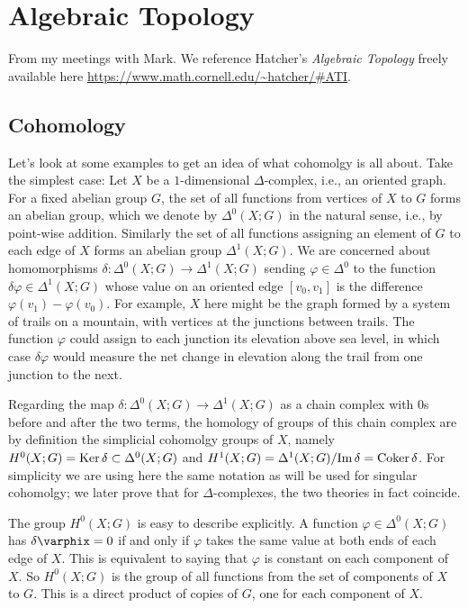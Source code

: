 \chapter{Algebraic Topology}
From my meetings with Mark. We reference Hatcher's \emph{Algebraic
  Topology} \cite{hatcher} freely available here
\url{https://www.math.cornell.edu/~hatcher/#ATI}.

\section{Cohomology}
Let's look at some examples to get an idea of what cohomolgy is all
about. Take the simplest case: Let \(X\) be a \(1\)-dimensional
\(\Delta\)-complex, i.e., an oriented graph. For a fixed abelian group
\(G\), the set of all functions from vertices of \(X\) to \(G\) forms an
abelian group, which we denote by \(\Delta^0(X;G)\) in the natural sense,
i.e., by point-wise addition. Similarly the set of all functions assigning
an element of \(G\) to each edge of \(X\) forms an abelian group
\(\Delta^1(X;G)\). We are concerned about homomorphisms
\(\delta\colon\Delta^0(X;G)\to\Delta^1(X;G)\) sending
\(\varphi\in\Delta^0\) to the function \(\delta\varphi\in\Delta^1(X;G)\)
whose value on an oriented edge \([v_0,v_1]\) is the difference
\(\varphi(v_1)-\varphi(v_0)\). For example, \(X\) here might be the graph
formed by a system of trails on a mountain, with vertices at the junctions
between trails. The function \(\varphi\) could assign to each junction its
elevation above sea level, in which case \(\delta\varphi\) would measure
the net change in elevation along the trail from one junction to the next.

Regarding the map \(\delta\colon\Delta^0(X;G)\to\Delta^1(X;G)\) as a chain
complex with \(0\)s before and after the two terms, the homology of groups
of this chain complex are by definition the simplicial cohomolgy groups of
\(X\), namely \(H^0(X;G)=\operatorname{Ker}\delta\subset\Delta^0(X;G)\) and
\(H^1(X;G)=\Delta^1(X;G)/{\operatorname{Im}\delta}=\operatorname{Coker}\delta\). For simplicity we are
using here the same notation as will be used for singular cohomolgy; we
later prove that for \(\Delta\)-complexes, the two theories in fact
coincide.

The group \(H^0(X;G)\) is easy to describe explicitly. A function
\(\varphi\in\Delta^0(X;G)\) has \(\delta\varphix=0\) if and only if
\(\varphi\) takes the same value at both ends of each edge of \(X\). This
is equivalent to saying that \(\varphi\) is constant on each component of
\(X\). So \(H^0(X;G)\) is the group of all functions from the set of
components of \(X\) to \(G\). This is a direct product of copies of \(G\),
one for each component of \(X\).

